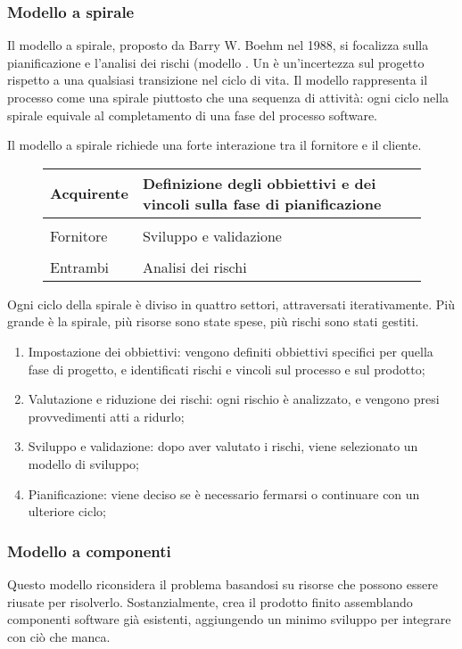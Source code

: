 \subsubsection{Modello a spirale}
Il modello a spirale, proposto da Barry W. Boehm nel 1988, si focalizza sulla pianificazione e l'analisi dei rischi (modello . Un  è un'incertezza sul progetto rispetto a una qualsiasi transizione nel ciclo di vita. Il modello rappresenta il processo come una spirale piuttosto che una sequenza di attività: ogni ciclo nella spirale equivale al completamento di una fase del processo software.

Il modello a spirale richiede una forte interazione tra il fornitore e il cliente.
\begin{figure}[h!]
	\centering
	\begin{tabular}{|l|l|}
		\hline	
		Acquirente & Definizione degli obbiettivi e dei vincoli sulla fase di pianificazione \\
		\hline \\
		Fornitore & Sviluppo e validazione \\
		\hline \\
		Entrambi & Analisi dei rischi \\
		\hline
	\end{tabular}
\end{figure}

Ogni ciclo della spirale è diviso in quattro settori, attraversati iterativamente. Più grande è la spirale, più risorse sono state spese, più rischi sono stati gestiti.
\begin{enumerate}
	\item Impostazione dei obbiettivi: vengono definiti obbiettivi specifici per quella fase di progetto, e identificati rischi e vincoli sul processo e sul prodotto;
	\item Valutazione e riduzione dei rischi: ogni rischio è analizzato, e vengono presi provvedimenti atti a ridurlo;
	\item Sviluppo e validazione: dopo aver valutato i rischi, viene selezionato un modello di sviluppo;
	\item Pianificazione: viene deciso se è necessario fermarsi o continuare con un ulteriore ciclo;
\end{enumerate}

\subsubsection{Modello a componenti}
Questo modello riconsidera il problema basandosi su risorse che possono essere riusate per risolverlo. Sostanzialmente, crea il prodotto finito assemblando componenti software già esistenti, aggiungendo un minimo sviluppo per integrare con ciò che manca.

